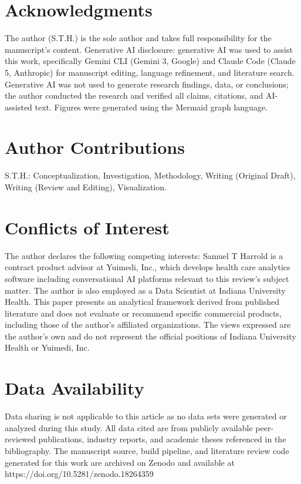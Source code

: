 \documentclass[
  american,
  11pt,
  letterpaper,
  oneside  ,captions=tableheading
]{scrartcl}
\begin{document}
\section{Acknowledgments}\label{acknowledgments}

The author (S.T.H.) is the sole author and takes full responsibility for
the manuscript's content. Generative AI disclosure: generative AI was
used to assist this work, specifically Gemini CLI (Gemini 3, Google) and
Claude Code (Claude 5, Anthropic) for manuscript editing, language
refinement, and literature search. Generative AI was not used to
generate research findings, data, or conclusions; the author conducted
the research and verified all claims, citations, and AI-assisted text.
Figures were generated using the Mermaid graph language.

\section{Author Contributions}\label{author-contributions}

S.T.H.: Conceptualization, Investigation, Methodology, Writing (Original
Draft), Writing (Review and Editing), Visualization.

\section{Conflicts of Interest}\label{conflicts-of-interest}

The author declares the following competing interests: Samuel T Harrold
is a contract product advisor at Yuimedi, Inc., which develops health
care analytics software including conversational AI platforms relevant
to this review's subject matter. The author is also employed as a Data
Scientist at Indiana University Health. This paper presents an
analytical framework derived from published literature and does not
evaluate or recommend specific commercial products, including those of
the author's affiliated organizations. The views expressed are the
author's own and do not represent the official positions of Indiana
University Health or Yuimedi, Inc.

\section{Data Availability}\label{data-availability}

Data sharing is not applicable to this article as no data sets were
generated or analyzed during this study. All data cited are from
publicly available peer-reviewed publications, industry reports, and
academic theses referenced in the bibliography. The manuscript source,
build pipeline, and literature review code generated for this work are
archived on Zenodo and available at
https://doi.org/10.5281/zenodo.18264359
\end{document}
